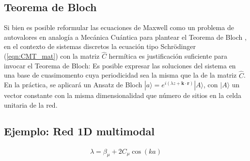 \subsection{Teorema de Bloch}

Si bien es posible reformular las ecuaciones de Maxwell como un problema de autovalores en analogía a Mecánica Cuántica para plantear el Teorema de Bloch \cite{joannopoulos_photonic_2008}, en el contexto de sistemas discretos la ecuación tipo Schrödinger (\ref{eqn:CMT_mat}) con la matriz $\hat{C}$ hermítica es justificación suficiente para invocar el Teorema de Bloch: Es posible expresar las soluciones del sistema en una base de cuasimomento cuya periodicidad sea la misma que la de la matriz $\hat{C}$. En la práctica, se aplicará un Ansatz de Bloch $|a\rangle = e^{i(\lambda z + \textbf{k}\cdot \textbf{r})}|A\rangle$, con $|A\rangle$ un vector constante con la misma dimensionalidad que número de sitios en la celda unitaria de la red.

\subsection{Ejemplo: Red 1D multimodal}

\begin{align*}
	 \lambda = \beta_\mu + 2 C_\mu \cos(k a)
\end{align*}
